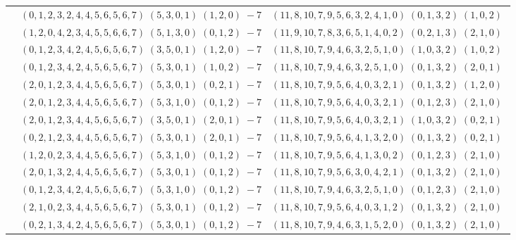 \documentclass[11pt]{article}
\begin{document}
\begin{longtable}[l]{|c|c|c|}
 \cline{2-3} 
 & $(0 ,1 ,2 ,3 ,2 ,4 ,4 ,5 ,6 ,5 ,6 ,7) \;(5 ,3 ,0 ,1) \;(1 ,2 ,0) \;-7$ & $(11 ,8 ,10 ,7 ,9 ,5 ,6 ,3 ,2 ,4 ,1 ,0) \;(0 ,1 ,3 ,2) \;(1 ,0 ,2) \;$\\ 
 \cline{2-3} 
 & $(1 ,2 ,0 ,4 ,2 ,3 ,4 ,5 ,5 ,6 ,6 ,7) \;(5 ,1 ,3 ,0) \;(0 ,1 ,2) \;-7$ & $(11 ,9 ,10 ,7 ,8 ,3 ,6 ,5 ,1 ,4 ,0 ,2) \;(0 ,2 ,1 ,3) \;(2 ,1 ,0) \;$\\ 
 \cline{2-3} 
 & $(0 ,1 ,2 ,3 ,4 ,2 ,4 ,5 ,6 ,5 ,6 ,7) \;(3 ,5 ,0 ,1) \;(1 ,2 ,0) \;-7$ & $(11 ,8 ,10 ,7 ,9 ,4 ,6 ,3 ,2 ,5 ,1 ,0) \;(1 ,0 ,3 ,2) \;(1 ,0 ,2) \;$\\ 
 \cline{2-3} 
 & $(0 ,1 ,2 ,3 ,4 ,2 ,4 ,5 ,6 ,5 ,6 ,7) \;(5 ,3 ,0 ,1) \;(1 ,0 ,2) \;-7$ & $(11 ,8 ,10 ,7 ,9 ,4 ,6 ,3 ,2 ,5 ,1 ,0) \;(0 ,1 ,3 ,2) \;(2 ,0 ,1) \;$\\ 
 \cline{2-3} 
 & $(2 ,0 ,1 ,2 ,3 ,4 ,4 ,5 ,6 ,5 ,6 ,7) \;(5 ,3 ,0 ,1) \;(0 ,2 ,1) \;-7$ & $(11 ,8 ,10 ,7 ,9 ,5 ,6 ,4 ,0 ,3 ,2 ,1) \;(0 ,1 ,3 ,2) \;(1 ,2 ,0) \;$\\ 
 \cline{2-3} 
 & $(2 ,0 ,1 ,2 ,3 ,4 ,4 ,5 ,6 ,5 ,6 ,7) \;(5 ,3 ,1 ,0) \;(0 ,1 ,2) \;-7$ & $(11 ,8 ,10 ,7 ,9 ,5 ,6 ,4 ,0 ,3 ,2 ,1) \;(0 ,1 ,2 ,3) \;(2 ,1 ,0) \;$\\ 
 \cline{2-3} 
 & $(2 ,0 ,1 ,2 ,3 ,4 ,4 ,5 ,6 ,5 ,6 ,7) \;(3 ,5 ,0 ,1) \;(2 ,0 ,1) \;-7$ & $(11 ,8 ,10 ,7 ,9 ,5 ,6 ,4 ,0 ,3 ,2 ,1) \;(1 ,0 ,3 ,2) \;(0 ,2 ,1) \;$\\ 
 \cline{2-3} 
 & $(0 ,2 ,1 ,2 ,3 ,4 ,4 ,5 ,6 ,5 ,6 ,7) \;(5 ,3 ,0 ,1) \;(2 ,0 ,1) \;-7$ & $(11 ,8 ,10 ,7 ,9 ,5 ,6 ,4 ,1 ,3 ,2 ,0) \;(0 ,1 ,3 ,2) \;(0 ,2 ,1) \;$\\ 
 \cline{2-3} 
 & $(1 ,2 ,0 ,2 ,3 ,4 ,4 ,5 ,6 ,5 ,6 ,7) \;(5 ,3 ,1 ,0) \;(0 ,1 ,2) \;-7$ & $(11 ,8 ,10 ,7 ,9 ,5 ,6 ,4 ,1 ,3 ,0 ,2) \;(0 ,1 ,2 ,3) \;(2 ,1 ,0) \;$\\ 
 \cline{2-3} 
 & $(2 ,0 ,1 ,3 ,2 ,4 ,4 ,5 ,6 ,5 ,6 ,7) \;(5 ,3 ,0 ,1) \;(0 ,1 ,2) \;-7$ & $(11 ,8 ,10 ,7 ,9 ,5 ,6 ,3 ,0 ,4 ,2 ,1) \;(0 ,1 ,3 ,2) \;(2 ,1 ,0) \;$\\ 
 \cline{2-3} 
 & $(0 ,1 ,2 ,3 ,4 ,2 ,4 ,5 ,6 ,5 ,6 ,7) \;(5 ,3 ,1 ,0) \;(0 ,1 ,2) \;-7$ & $(11 ,8 ,10 ,7 ,9 ,4 ,6 ,3 ,2 ,5 ,1 ,0) \;(0 ,1 ,2 ,3) \;(2 ,1 ,0) \;$\\ 
 \cline{2-3} 
 & $(2 ,1 ,0 ,2 ,3 ,4 ,4 ,5 ,6 ,5 ,6 ,7) \;(5 ,3 ,0 ,1) \;(0 ,1 ,2) \;-7$ & $(11 ,8 ,10 ,7 ,9 ,5 ,6 ,4 ,0 ,3 ,1 ,2) \;(0 ,1 ,3 ,2) \;(2 ,1 ,0) \;$\\ 
 \cline{2-3} 
 & $(0 ,2 ,1 ,3 ,4 ,2 ,4 ,5 ,6 ,5 ,6 ,7) \;(5 ,3 ,0 ,1) \;(0 ,1 ,2) \;-7$ & $(11 ,8 ,10 ,7 ,9 ,4 ,6 ,3 ,1 ,5 ,2 ,0) \;(0 ,1 ,3 ,2) \;(2 ,1 ,0) \;$\\ 

\end{longtable}
\end{document}

